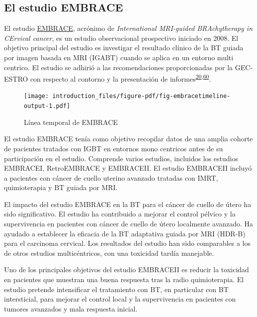 \documentclass[
  a4paper,
]{scrreprt}
\begin{document}
\hypertarget{el-estudio-embrace}{%
\subsection{El estudio EMBRACE}\label{el-estudio-embrace}}

El estudio \href{www.embracestudy.dk}{EMBRACE}, acrónimo de
\emph{International MRI-guided BRAchytherapy in CErvical cancer}, es un
estudio observacional prospectivo iniciado en 2008. El objetivo
principal del estudio es investigar el resultado clínico de la BT guiada
por imagen basada en MRI (IGABT) cuando se aplica en un entorno multi
centrico. El estudio se adhirió a las recomendaciones proporcionadas por
la GEC-ESTRO con respecto al contorno y la presentación de
informes\textsuperscript{\protect\hyperlink{ref-haie-meder2005}{20},\protect\hyperlink{ref-potter2006}{60}}.

\begin{figure}

{\centering \texttt{[image: introduction\_files/figure-pdf/fig-embracetimeline-output-1.pdf]}

}

\caption{\label{fig-embracetimeline}Línea temporal de EMBRACE}

\end{figure}

El estudio EMBRACE tenía como objetivo recopilar datos de una amplia
cohorte de pacientes tratados con IGBT en entornos mono centricos antes
de su participación en el estudio. Comprende varios estudios, incluidos
los estudios EMBRACEI, RetroEMBRACE y EMBRACEII. El estudio EMBRACEII
incluyó a pacientes con cáncer de cuello uterino avanzado tratadas con
IMRT, quimioterapia y BT guiada por MRI.

El impacto del estudio EMBRACE en la BT para el cáncer de cuello de
útero ha sido significativo. El estudio ha contribuido a mejorar el
control pélvico y la supervivencia en pacientes con cáncer de cuello de
útero localmente avanzado. Ha ayudado a establecer la eficacia de la BT
adaptativa guiada por MRI (HDR-B) para el carcinoma cervical. Los
resultados del estudio han sido comparables a los de otros estudios
multicéntricos, con una toxicidad tardía manejable.

Uno de los principales objetivos del estudio EMBRACEII es reducir la
toxicidad en pacientes que muestran una buena respuesta tras la radio
quimioterapia. El estudio pretende intensificar el tratamiento con BT,
en particular con BT intersticial, para mejorar el control local y la
supervivencia en pacientes con tumores avanzados y mala respuesta
inicial.
\end{document}
